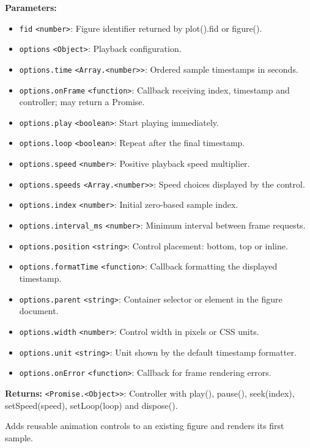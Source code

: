 \documentclass[12pt,a4paper]{article}
\begin{document}
\noindent \textbf{Parameters:}
\begin{itemize}
  \item \texttt{fid} \texttt{<number>}: Figure identifier returned by plot().fid or figure().
  \item \texttt{options} \texttt{<Object>}: Playback configuration.
  \item \texttt{options.time} \texttt{<Array.<number>>}: Ordered sample timestamps in seconds.
  \item \texttt{options.onFrame} \texttt{<function>}: Callback receiving index, timestamp and controller; may return a Promise.
  \item \texttt{options.play} \texttt{<boolean>}: Start playing immediately.
  \item \texttt{options.loop} \texttt{<boolean>}: Repeat after the final timestamp.
  \item \texttt{options.speed} \texttt{<number>}: Positive playback speed multiplier.
  \item \texttt{options.speeds} \texttt{<Array.<number>>}: Speed choices displayed by the control.
  \item \texttt{options.index} \texttt{<number>}: Initial zero-based sample index.
  \item \texttt{options.interval\_ms} \texttt{<number>}: Minimum interval between frame requests.
  \item \texttt{options.position} \texttt{<string>}: Control placement: bottom, top or inline.
  \item \texttt{options.formatTime} \texttt{<function>}: Callback formatting the displayed timestamp.
  \item \texttt{options.parent} \texttt{<string>}: Container selector or element in the figure document.
  \item \texttt{options.width} \texttt{<number>}: Control width in pixels or CSS units.
  \item \texttt{options.unit} \texttt{<string>}: Unit shown by the default timestamp formatter.
  \item \texttt{options.onError} \texttt{<function>}: Callback for frame rendering errors.
\end{itemize}

\noindent \textbf{Returns:} \texttt{<Promise.<Object>>}: Controller with play(), pause(), seek(index), setSpeed(speed), setLoop(loop) and dispose().

\noindent Adds reusable animation controls to an existing figure and renders its first sample.
\end{document}
